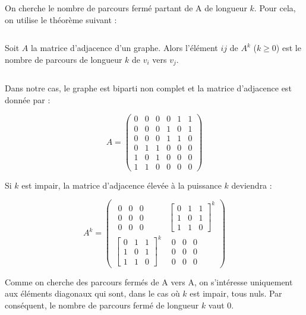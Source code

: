 \begin{solution}
On cherche le nombre de parcours fermé partant de A de longueur $k$.
Pour cela, on utilise le théorème suivant :

$\,$

Soit $A$ la matrice d'adjacence d'un graphe. Alors l'élément $ij$
de $A^{k}$ ($k\geq0$) est le nombre de parcours de longueur $k$
de $v_{i}$ vers $v_{j}$.

$\,$

Dans notre cas, le graphe est biparti non complet et la matrice d'adjacence
est donnée par :

\[
A=\left(\begin{array}{cccccc}
0 & 0 & 0 & 0 & 1 & 1\\
0 & 0 & 0 & 1 & 0 & 1\\
0 & 0 & 0 & 1 & 1 & 0\\
0 & 1 & 1 & 0 & 0 & 0\\
1 & 0 & 1 & 0 & 0 & 0\\
1 & 1 & 0 & 0 & 0 & 0
\end{array}\right)
\]


Si $k$ est impair, la matrice d'adjacence élevée à la puissance $k$
deviendra :

\[
A^{k}=\left(\begin{array}{cc}
\begin{array}{ccc}
0 & 0 & 0\\
0 & 0 & 0\\
0 & 0 & 0
\end{array} & \left[\begin{array}{ccc}
0 & 1 & 1\\
1 & 0 & 1\\
1 & 1 & 0
\end{array}\right]^{k}\\
\left[\begin{array}{ccc}
0 & 1 & 1\\
1 & 0 & 1\\
1 & 1 & 0
\end{array}\right]^{k} & \begin{array}{ccc}
0 & 0 & 0\\
0 & 0 & 0\\
0 & 0 & 0
\end{array}
\end{array}\right)
\]


Comme on cherche des parcours fermés de A vers A, on s'intéresse uniquement
aux éléments diagonaux qui sont, dans le cas où $k$ est impair, tous
nuls. Par conséquent, le nombre de parcours fermé de longueur $k$
vaut 0.


\end{solution}
